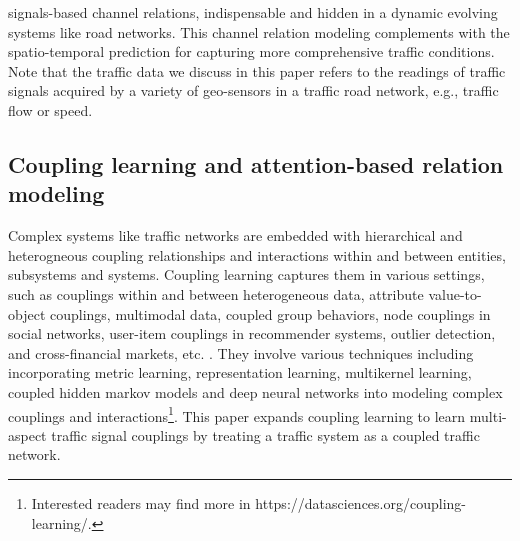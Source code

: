 signals-based channel relations, indispensable and hidden in a dynamic evolving systems like road  networks. This channel relation modeling complements with the spatio-temporal prediction for capturing more comprehensive traffic conditions. Note that the traffic data we discuss in this paper refers to the readings of traffic signals acquired by a variety of geo-sensors in a traffic road network, e.g., traffic flow or speed. 

\subsection{Coupling learning and attention-based relation modeling}
Complex systems like traffic networks are embedded with hierarchical and heterogneous coupling relationships and interactions within and between entities, subsystems and systems. Coupling learning captures them in various settings, such as couplings within and between heterogeneous data, attribute value-to-object couplings, multimodal data, coupled group behaviors, node couplings in social networks, user-item couplings in recommender systems, outlier detection, and cross-financial markets, etc. \cite{2015Coupling,cao2016non,Huaaai19,zhu2020unsupervised,WangGC21,2018CoupledCF}. They involve various techniques including incorporating metric learning, representation learning, multikernel learning, coupled hidden markov models and deep neural networks into modeling complex couplings and interactions\footnote{Interested readers may find more in https://datasciences.org/coupling-learning/.}. This paper expands coupling learning to learn multi-aspect traffic signal couplings by treating a traffic system as a coupled traffic network.

